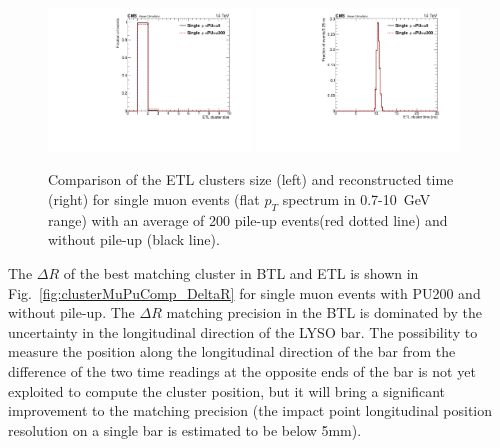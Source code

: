 \begin{figure}[!h]
\centering
\includegraphics[width=0.48\textwidth]{fig/performance/ClusterAndTracks/noPreliminary/ETLbestCluster_size_muPUcomp-4.pdf}
\includegraphics[width=0.48\textwidth]{fig/performance/ClusterAndTracks/noPreliminary/ETLbestCluster_time_muPUcomp-4.pdf}
\caption{Comparison of the ETL clusters size (left) and reconstructed time (right)
for single muon events (flat $p_{T}$ spectrum in 0.7-10~GeV range) with an average of 200 pile-up events(red dotted line) and without pile-up (black line).}
\label{fig:clusterMuPuComp_ETL}
\end{figure}

The $\Delta R$ of the best matching cluster in BTL and ETL is shown in Fig.~\ref{fig:clusterMuPuComp_DeltaR} for single muon events with PU200 and without pile-up.
The $\Delta R$ matching precision in the BTL is dominated by the uncertainty in the longitudinal direction of the LYSO bar. The possibility to measure the position along the longitudinal direction of the bar from the difference of the two time readings at the opposite ends of the bar is not yet exploited to compute the cluster position, but it will bring a significant improvement to the matching precision (the impact point longitudinal position resolution on a single bar is estimated to be below 5mm). 

